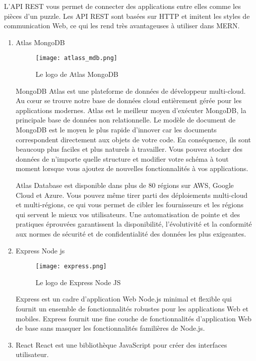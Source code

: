     L'API REST vous permet de connecter des applications entre elles comme les pièces d'un puzzle. Les API REST sont basées sur HTTP et imitent les styles de communication Web, ce qui les rend très avantageuses à utiliser dans MERN.
    \begin{enumerate}\bfseries
        \item Atlas MongoDB\newline
        \begin{figure}[H]
            \centering
            \texttt{[image: atlass\_mdb.png]}
            \caption{Le logo de Atlas MongoDB}\label{fig:atlass_mdb}
        \end{figure}
        \normalfont
        MongoDB Atlas est une plateforme de données de développeur multi-cloud. Au cœur se trouve notre base de données cloud entièrement gérée pour les applications modernes. Atlas est le meilleur moyen d'exécuter MongoDB, la principale base de données non relationnelle. Le modèle de document de MongoDB est le moyen le plus rapide d'innover car les documents correspondent directement aux objets de votre code. En conséquence, ils sont beaucoup plus faciles et plus naturels à travailler. Vous pouvez stocker des données de n'importe quelle structure et modifier votre schéma à tout moment lorsque vous ajoutez de nouvelles fonctionnalités à vos applications.

        Atlas Database est disponible dans plus de 80 régions sur AWS, Google Cloud et Azure. Vous pouvez même tirer parti des déploiements multi-cloud et multi-régions, ce qui vous permet de cibler les fournisseurs et les régions qui servent le mieux vos utilisateurs. Une automatisation de pointe et des pratiques éprouvées garantissent la disponibilité, l'évolutivité et la conformité aux normes de sécurité et de confidentialité des données les plus exigeantes.
        \bfseries
        \item Express Node js\newline
        \begin{figure}[H]
            \centering
            \texttt{[image: express.png]}
            \caption{Le logo de Express Node JS}\label{fig:express}
        \end{figure}
        \normalfont
        Express est un cadre d'application Web Node.js minimal et flexible qui fournit un ensemble  de fonctionnalités robustes pour les applications Web et mobiles. 
        Express fournit une fine couche de fonctionnalités d'application Web de base sans masquer les fonctionnalités familières de Node.js.
        \bfseries
        \item React\newline
        \normalfont
        React est une bibliothèque JavaScript pour créer des interfaces utilisateur. 


\end{enumerate}
